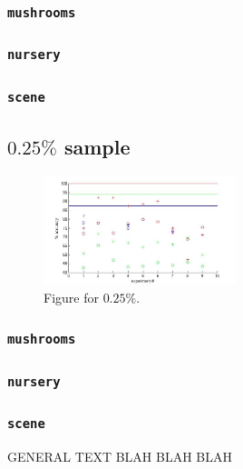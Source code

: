 \documentclass[12pt, a4paper, pdflatex]{report}
\begin{document}
\subsubsection{\texttt{mushrooms}}
\subsubsection{\texttt{nursery}}
\subsubsection{\texttt{scene}}

\subsection{$\mathbf{0.25\%}$ sample~\cite{results025}}

\begin{figure}[htbp]
\centering
  \includegraphics[width=0.5\textwidth]{graphics/figures/Pfig3.jpg}
\begin{tiny}
\caption{\small Figure for $0.25\%$.\label{img:025pc}}
\end{tiny}
\end{figure}

\subsubsection{\texttt{mushrooms}}
\subsubsection{\texttt{nursery}}
\subsubsection{\texttt{scene}}


GENERAL TEXT BLAH BLAH BLAH
\end{document}
